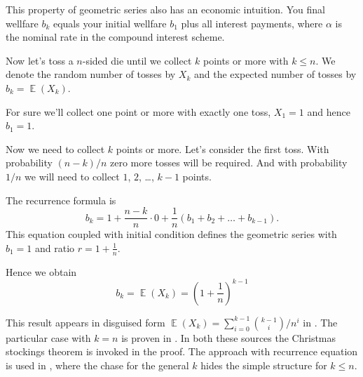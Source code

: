 \documentclass{article}
\DeclareMathOperator{\E}{\mathbb{E}}
\begin{document}
This property of geometric series also has an economic intuition. 
You final wellfare $b_k$ equals your initial wellfare $b_1$ plus all interest payments,
where $\alpha$ is the nominal rate in the compound interest scheme.


Now let's toss a $n$-sided die until we collect $k$ points or more with $k\leq n$.
We denote the random number of tosses by $X_k$ and the expected number of tosses 
by $b_k = \E(X_k)$. 

For sure we'll collect one point or more with exactly one toss, $X_1 = 1$ and hence $b_1 = 1$. 

Now we need to collect $k$ points or more. Let's consider the first toss.
With probability $(n - k)/n$ zero more tosses will be required. 
And with probability $1/n$ we will need to collect $1$, $2$, \ldots, $k-1$ points.

The recurrence formula is
\[
b_k = 1 + \frac{n - k}{n} \cdot 0 + \frac{1}{n} (b_1 + b_2 + \ldots + b_{k-1}).
\]
This equation coupled with initial condition defines the geometric series with $b_1 = 1$ and ratio $r = 1 + \frac{1}{n}$.

Hence we obtain
\[
b_k = \E(X_k) = \left( 1 + \frac{1}{n} \right)^{k-1}
\]


This result appears in disguised form $\E(X_k) = \sum_{i=0}^{k-1} \binom{k-1}{i} / n^i$ in \cite{conroy2021collection}.
The particular case with $k=n$ is proven in \cite{trevino2020expected}.
In both these sources the Christmas stockings theorem is invoked in the proof. 
The approach with recurrence equation is used in \cite{146114}, 
where the chase for the general $k$ hides the simple structure for $k\leq n$. 








\end{document}

